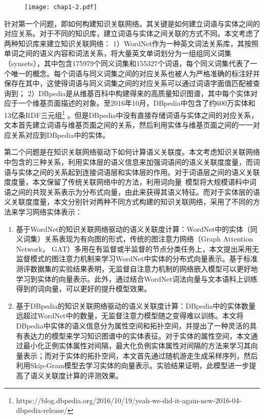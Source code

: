 \begin{figure}[!ht]
    \centerline{\texttt{[image: chap1-2.pdf]}}
    \label{chap1-2}
\end{figure}

针对第一个问题，即如何构建知识关联网络。其关键是如何建立词语与实体之间的对应关系。对于不同的知识库，建立词语与实体之间关联的方式不同。本文考虑了两种知识库来建立知识关联网络：
1）WordNet作为一种英文词法关系库，其按照单词之间的语义内容和词法关系，将大量英文单词划分为一组组同义词集（synsets），其中包含175979个同义词集和155327个词语，每个同义词集代表了一个唯一的概念。每个词语与同义词集之间的对应关系也被人为严格准确的标注好并保存在其中，这使得词语与同义词集之间的对应关系可以通过词语字面值匹配被查询到；
2）DBpedia是从维基百科中构建得来的高质量知识图谱，其中每个实体对应于一个维基页面描述的对象。至2016年10月，DBpedia中包含了约600万实体和13亿条RDF三元组\footnote{https://blog.dbpedia.org/2016/10/19/yeah-we-did-it-again-new-2016-04-dbpedia-release/} 。但是DBpedia中没有直接存储词语与实体之间的对应关系，文本首先建立词语与维基页面之间的关系，然后利用实体与维基页面之间的一一对应关系对应到DBpedia中的实体。

第二个问题是在知识关联网络驱动下如何计算语义关联度。本文考虑知识关联网络中包含的三种关系，利用实体层的语义信息来加强词语间的语义关联度度量，而词语与实体之间的关系起到连接词语层和实体层的作用。对于词语层之间的语义关联度度量，本文保留了传统关联网络中的方法，利用词向量~\cite{corr/Mikolov13, emnlp/PenningtonSM14}模型将大规模语料中词语之间的共现关系表示为分布式向量，由此来获得其语义特征。而对于实体层的语义关联度度量，本文分别针对两种不同方式构建的知识关联网络，采用了不同的方法来学习网络实体表示：
\begin{enumerate}[（1）]
    \item 基于WordNet的知识关联网络驱动的语义关联度计算：WordNet中的实体（同义词集）关系表现为有向图的形式，传统的图注意力网络（Graph Attention Network， GAT）\cite{iclr/VelickovicCCRLB18}多用在有监督或半监督的节点分类任务上，本文提出采用无监督模式的图注意力机制来学习WordNet中实体的分布式向量表示。基于标准测评数据集的实验结果表明，无监督自注意力机制的网络嵌入模型可以更好地学习到实体的向量表示。此外，通过结合WordNet词法向量与文本语料上训练得到的词向量，可以更好的提升模型效果。
    \item 基于DBpedia的知识关联网络驱动的语义关联度计算：DBpedia中的实体数量远超过WordNet中的数量，无监督注意力模型随之变得难以训练。本文将DBpedia中实体的语义信息分为属性空间和拓扑空间，并提出了一种灵活的具有表达力的模型来学习知识图谱中的实体表征。对于实体的属性空间，本文通过最小化正例实体属性对间隔，最大化负例实体属性对间隔的方法来学习其向量表示；而对于实体的拓扑空间，本文首先通过随机游走生成采样序列，然后利用Skip-Gram\cite{corr/Mikolov13}模型去学习实体的向量表示。实验结果证明，此模型进一步提高了语义关联度计算的评测效果。
\end{enumerate}


